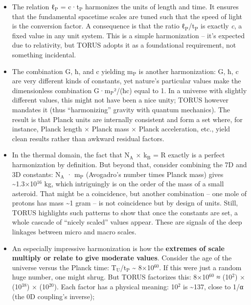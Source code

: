 \documentclass[]{article}
\newcommand{\subscript}[1]{\ensuremath{_{\mathrm{#1}}}}
\newcommand{\superscript}[1]{\ensuremath{^{\mathrm{#1}}}}
\begin{document}
\begin{itemize}
\item
  The relation
  ℓ\subscript{P} =
  c·t\subscript{P}
  harmonizes the units of length and time. It ensures that the
  fundamental spacetime scales are tuned such that the speed of light is
  the conversion factor. A consequence is that the ratio
  ℓ\subscript{P}/t\subscript{P}
  is exactly \emph{c}, a fixed value in any unit system. This is a
  simple harmonization -- it's expected due to relativity, but TORUS
  adopts it as a foundational requirement, not something incidental.
\item
  The combination G, ħ, and c yielding
  m\subscript{P} is another
  harmonization: G, ħ, c are very different kinds of constants, yet
  nature's particular values make the dimensionless combination
  G·m\subscript{P}²/(ħc)
  equal to 1​. In a universe with slightly different values, this might
  not have been a nice unity; TORUS however mandates it (thus
  ``harmonizing'' gravity with quantum mechanics). The result is that
  Planck units are internally consistent and form a set where, for
  instance, Planck length × Planck mass × Planck acceleration, etc.,
  yield clean results rather than awkward residual factors.
\item
  In the thermal domain, the fact that
  N\subscript{A} ×
  k\subscript{B} = R
  exactly is a perfect harmonization by definition. But beyond that,
  consider combining the 7D and 3D constants:
  N\subscript{A} ·
  m\subscript{P}
  (Avogadro's number times Planck mass) gives
  \textasciitilde{}1.3×10\superscript{16} kg​, which intriguingly is on the order
  of the mass of a small asteroid. That might be a coincidence, but
  another combination -- one mole of protons has mass \textasciitilde{}1
  gram -- is not coincidence but by design of units. Still, TORUS
  highlights such patterns to show that once the constants are set, a
  whole cascade of ``nicely scaled'' values appear. These are signals of
  the deep linkages between micro and macro scales.
\item
  An especially impressive harmonization is how the \textbf{extremes of
  scale multiply or relate to give moderate values}. Consider the age of
  the universe versus the Planck time:
  T\subscript{U}/t\subscript{P}
  \textasciitilde{} 8×10\superscript{60}. If this were just a random huge number,
  one might shrug. But TORUS factorizes this: 8×10\superscript{60} ≈ (10\superscript{2}) ×
  (10\superscript{38}) × (10\superscript{20})​. Each factor has a physical meaning: 10\superscript{2}
  is \textasciitilde{}137, close to 1/α (the 0D coupling's inverse)​;

\end{itemize}
\end{document}
